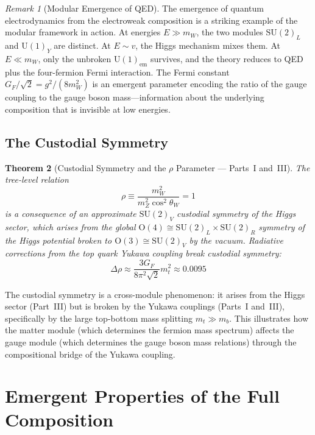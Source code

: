 \documentclass[12pt]{article}
\newtheorem{theorem}{Theorem}[section]
\theoremstyle{definition}
\theoremstyle{remark}
\newtheorem{remark}[theorem]{Remark}
\newcommand{\su}[1]{\mathrm{SU}(#1)}
\newcommand{\uu}[1]{\mathrm{U}(#1)}
\begin{document}
\begin{remark}[Modular Emergence of QED]
The emergence of quantum electrodynamics from the electroweak composition is a striking example of the modular framework in action. At energies $E \gg m_W$, the two modules $\su{2}_L$ and $\uu{1}_Y$ are distinct. At $E \sim v$, the Higgs mechanism mixes them. At $E \ll m_W$, only the unbroken $\uu{1}_{\mathrm{em}}$ survives, and the theory reduces to QED plus the four-fermion Fermi interaction. The Fermi constant $G_F/\sqrt{2} = g^2/(8m_W^2)$ is an emergent parameter encoding the ratio of the gauge coupling to the gauge boson mass---information about the underlying composition that is invisible at low energies.
\end{remark}

\subsection{The Custodial Symmetry}

\begin{theorem}[Custodial Symmetry and the $\rho$ Parameter --- Parts~I and~III]
\label{thm:custodial}
The tree-level relation
\begin{equation}
\rho \equiv \frac{m_W^2}{m_Z^2\cos^2\theta_W} = 1
\end{equation}
is a consequence of an approximate $\su{2}_V$ custodial symmetry of the Higgs sector, which arises from the global $\mathrm{O}(4) \cong \su{2}_L \times \su{2}_R$ symmetry of the Higgs potential broken to $\mathrm{O}(3) \cong \su{2}_V$ by the vacuum. Radiative corrections from the top quark Yukawa coupling break custodial symmetry:
\begin{equation}
\Delta\rho \approx \frac{3G_F}{8\pi^2\sqrt{2}}m_t^2 \approx 0.0095
\end{equation}
\end{theorem}

The custodial symmetry is a cross-module phenomenon: it arises from the Higgs sector (Part~III) but is broken by the Yukawa couplings (Parts~I and~III), specifically by the large top-bottom mass splitting $m_t \gg m_b$. This illustrates how the matter module (which determines the fermion mass spectrum) affects the gauge module (which determines the gauge boson mass relations) through the compositional bridge of the Yukawa coupling.


\section{Emergent Properties of the Full Composition}
\label{sec:emergent}
\end{document}
